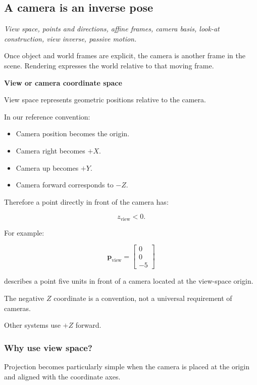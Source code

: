 \subsection{A camera is an inverse pose}\label{a-camera-is-an-inverse-pose}

\emph{View space, points and directions, affine frames, camera basis, look-at construction, view inverse, passive motion.}

Once object and world frames are explicit, the camera is another frame in the scene. Rendering expresses the world relative to that moving frame.

\textbf{View or camera coordinate space}

View space represents geometric positions relative to the camera.

In our reference convention:

\begin{itemize}
\tightlist
\item
  Camera position becomes the origin.
\item
  Camera right becomes \(+X\).
\item
  Camera up becomes \(+Y\).
\item
  Camera forward corresponds to \(-Z\).
\end{itemize}

Therefore a point directly in front of the camera has:

\[
 z_{\mathrm{view}}<0.
\]

For example:

\[
 \boxed{ \mathbf p_{\mathrm{view}}= \begin{bmatrix}0\\0\\-5\end{bmatrix} }
\]

describes a point five units in front of a camera located at the view-space origin.

The negative \(Z\) coordinate is a convention, not a universal requirement of cameras.

Other systems use \(+Z\) forward.

\subsubsection{Why use view space?}\label{why-use-view-space}

Projection becomes particularly simple when the camera is placed at the origin and aligned with the coordinate axes.

